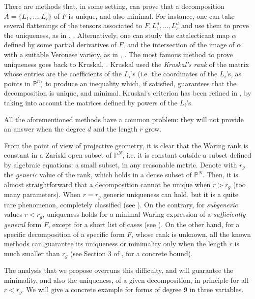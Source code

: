 \documentclass{amsart}
\newcommand{\Pj}{\mathbb{P}}
\theoremstyle{definition}
\begin{document}
There are methods that, in some setting, can prove that a decomposition $A=\{L_1,\dots,L_r\}$ of $F$ is unique,
and also minimal. For instance,
one can take several flattenings of the tensors associated to $F,L_1^d,\dots, L_r^d $ and use them to prove the uniqueness, as in \cite{DomaLath13a}, \cite{DomaLath17}.
Alternatively, one can study the catalecticant map $\alpha$ defined by some partial derivatives of $F$, and the intersection of the image
of $\alpha$ with a suitable Veronese variety, as in \cite{LandOtt13},  \cite{MassaMellaStagliano18}. The most famous method to prove uniqueness goes back to
Kruskal, \cite{Kruskal77}. Kruskal used the {\it Kruskal's rank} of the matrix whose entries are the coefficients of the $L_i$'s (i.e. the coordinates
of the $L_i$'s, as points in $\Pj^n$) to produce an inequality which, if satisfied, guarantees that the decomposition is unique,
and minimal.
Kruskal's criterion has been refined in \cite{COttVan17b}, by taking into account the matrices defined by powers of the $L_i$'s.

All the aforementioned methods  have a common problem:  they will not provide an answer when the degree $d$ and
the length $r$ grow.

From the point of view of projective geometry, it is clear that the Waring rank is constant in a Zariski open subset of $\Pj^N$, i.e.
it is constant outside a subset defined by algebraic equations: a small subset, in any reasonable metric.
Denote with $r_g$ the {\it generic} value of the rank,  which holds in a dense subset of $\Pj^N$. Then, it is almost
straightforward that a decomposition cannot be unique when $r>r_g$ (too many parameters). When $r=r_g$ generic uniqueness can hold,
but it is a quite rare phenomenon, completely classified (see \cite{GaluppiMella}). On the contrary, for {\it subgeneric} values $r<r_g$, uniqueness 
holds for a minimal Waring expression of a {\it sufficiently general} form $F$, except for a short list of cases (see \cite{COttVan17a}). 
On the other hand, for a specific decomposition of a specific form $F$, whose rank is unknown, all the known methods can guarantee
its uniqueness or minimality only when the length $r$ is much smaller than $r_g$ (see Section 3 of \cite{AngeC}, for a concrete bound).

The analysis that we propose overruns this difficulty, and will guarantee the minimality, and also the uniqueness, of a given decomposition,
in principle for all $r<r_g$. We will give a concrete example for forms of degree $9$ in three variables.
\end{document}

